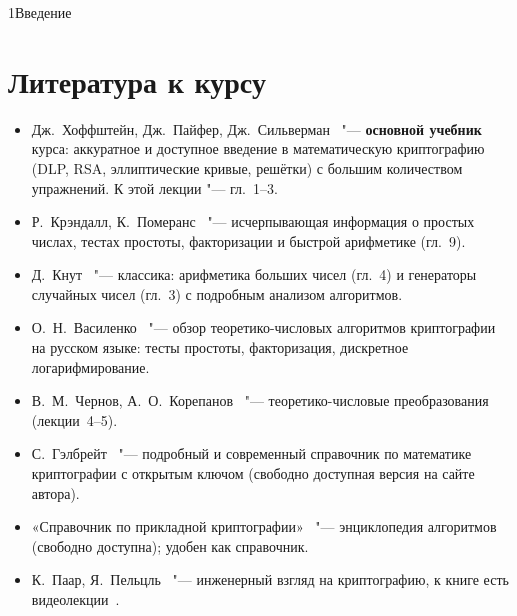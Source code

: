 \begin{lecture}{1}{Введение}
\section{Литература к курсу}

\begin{itemize}
  \item Дж.~Хоффштейн, Дж.~Пайфер, Дж.~Сильверман~\cite{hps} "--- \textbf{основной учебник}
    курса: аккуратное и доступное введение в математическую криптографию (DLP, RSA, эллиптические
    кривые, решётки) с большим количеством упражнений. К этой лекции "--- гл.~1--3.
  \item Р.~Крэндалл, К.~Померанс~\cite{crandall-pomerance} "--- исчерпывающая информация о
    простых числах, тестах простоты, факторизации и быстрой арифметике (гл.~9).
  \item Д.~Кнут~\cite{knuth-taocp2} "--- классика: арифметика больших чисел (гл.~4) и
    генераторы случайных чисел (гл.~3) с подробным анализом алгоритмов.
  \item О.~Н.~Василенко~\cite{vasilenko} "--- обзор теоретико-числовых алгоритмов
    криптографии на русском языке: тесты простоты, факторизация, дискретное логарифмирование.
  \item В.~М.~Чернов, А.~О.~Корепанов~\cite{chernov-korepanov} "--- теоретико-числовые
    преобразования (лекции~4--5).
  \item С.~Гэлбрейт~\cite{galbraith} "--- подробный и современный справочник по математике
    криптографии с открытым ключом (свободно доступная версия на сайте автора).
  \item «Справочник по прикладной криптографии»~\cite{hac} "--- энциклопедия алгоритмов
    (свободно доступна); удобен как справочник.
  \item К.~Паар, Я.~Пельцль~\cite{paar-pelzl} "--- инженерный взгляд на криптографию, к книге
    есть видеолекции~\cite{paar-lectures}.
\end{itemize}

\checkyourselfsection

\begin{furtherreading}
\end{furtherreading}
\end{lecture}

